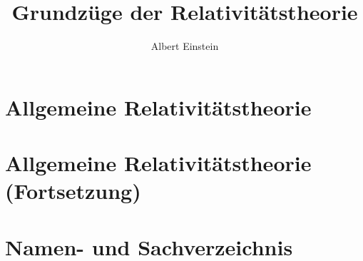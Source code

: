 \documentclass[10pt,oneside]{article} %
\author{Albert Einstein}
\title{Grundzüge der Relativitätstheorie}
\begin{document}
\setcounter{secnumdepth}{0}







\section{Allgemeine Relativitätstheorie}
\label{sec:all-1}

\section{Allgemeine Relativitätstheorie (Fortsetzung)}
\label{sec:all-2}

\appendix

\renewcommand{\thesection}{\Roman{section}}

\setcounter{secnumdepth}{1}





\setcounter{secnumdepth}{0}

\section{Namen- und Sachverzeichnis}
\label{sec:nam-1}

\printindex
\end{document}
